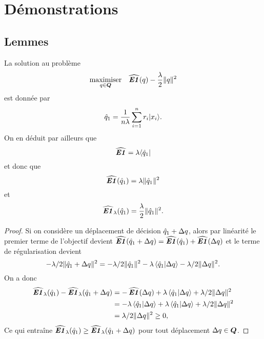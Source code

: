 \section{Démonstrations}

\subsection{Lemmes}

\begin{lemme}
  \label{lem:ndef}
  La solution au problème
  \begin{equation}
    \maximizeEquation[q \in \Q]{\hEN(q) - \frac{\lambda}{2}\|q\|^2}
  \end{equation}
  est donnée par
  \begin{equation}
    \qh_1 = \frac{1}{n\lambda}\sumi r_i|x_i\rangle.
  \end{equation}
  On en déduit par ailleurs que
  \begin{equation}
    \hEN = \lambda\langle\qh_1|
  \end{equation}
  et donc que
  \begin{equation}
    \hEN(\qh_1) = \lambda\|\qh_1\|^2
  \end{equation}
  et
  \begin{equation}
    \hEN_\lambda(\qh_1) = \frac{\lambda}{2}\|\qh_1\|^2.
  \end{equation}
\end{lemme}

\begin{proof}
  Si on considère un déplacement de décision $\qh_1 + \Delta q$, alors par linéarité le premier
  terme de l'objectif devient $\hEN(\qh_1+\Delta q) = \hEN(\qh_1) + \hEN(\Delta q)$ et le terme de
  régularisation devient
  \begin{equation}
    -\lambda/2\|\qh_1 + \Delta q\|^2 = -\lambda/2\|\qh_1\|^2 - \lambda\braket{\qh_1|\Delta q} - \lambda/2\|\Delta q\|^2.
  \end{equation}
  On a donc
  \begin{align}
    \hEN_\lambda(\qh_1)  - \hEN_\lambda(\qh_1+\Delta q) &= -\hEN(\Delta q) + \lambda\braket{\qh_1|\Delta q} + \lambda/2\|\Delta q\|^2\\
                                       &= -\lambda\braket{\qh_1|\Delta q} + \lambda\braket{\qh_1|\Delta q} +
                                         \lambda/2\|\Delta q\|^2\\
                                       &= \lambda/2\|\Delta q\|^2 \geq 0,
  \end{align}
  Ce qui entraîne $\hEN_\lambda(\qh_1) \geq \hEN_\lambda(\qh_1 + \Delta q)$ pour tout déplacement $\Delta q\in\Q$. 
\end{proof}


